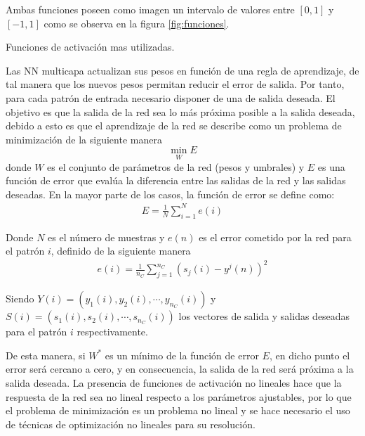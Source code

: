 Ambas funciones poseen como imagen un intervalo de valores entre $[0, 1]$ y $[-1, 1]$ como se observa en la figura \ref{fig:funciones}.%

\begin{imagen}
	\scalebox{1.0}{}
	\caption{Funciones de activación mas utilizadas.}
	\label{fig:funciones}
\end{imagen}

Las NN multicapa actualizan sus pesos en función de una regla de aprendizaje, de tal manera que los nuevos pesos permitan reducir el error de salida. Por tanto, para cada patrón de entrada necesario disponer de una de salida deseada. El objetivo es que la salida de la red sea lo más próxima posible a la salida deseada, debido a esto es que el aprendizaje de la red se describe como un problema de minimización de la siguiente manera $$ \min_{W} E $$ donde $W$ es el conjunto de parámetros de la red (pesos y umbrales) y $E$ es una función de error que evalúa la diferencia entre las salidas de la red y las salidas deseadas. En la mayor parte de los casos, la función de error se define como:
\begin{eqnarray}
	E = \frac{1}{N}\sum^{N}_{i = 1} e(i)
\end{eqnarray}

Donde $N$ es el número de muestras y $e(n)$ es el error cometido por la red para el patrón $i$, definido de la siguiente manera
\begin{eqnarray}
	e(i) = \frac{1}{n_{C}}\sum^{n_{C}}_{j = 1} (s_{j}(i) - y^{j}(n))^2\label{eq:error_patron}
\end{eqnarray}

Siendo $Y(i) = (y_{1}(i), y_{2}(i), \cdots, y_{n_{C}}(i))$ y $S(i) = (s_{1}(i), s_{2}(i), \cdots, s_{n_{C}}(i))$ los vectores de salida y salidas deseadas para el patrón $i$ respectivamente.

De esta manera, si $W^{*}$ es un mínimo de la función de error $E$, en dicho punto el error será cercano a cero, y en consecuencia, la salida de la red será próxima a la salida deseada. La presencia de funciones de activación no lineales hace que la respuesta de la red sea no lineal respecto a los parámetros ajustables, por lo que el problema de minimización es un problema no lineal y se hace necesario el uso de técnicas de optimización no lineales para su resolución.

